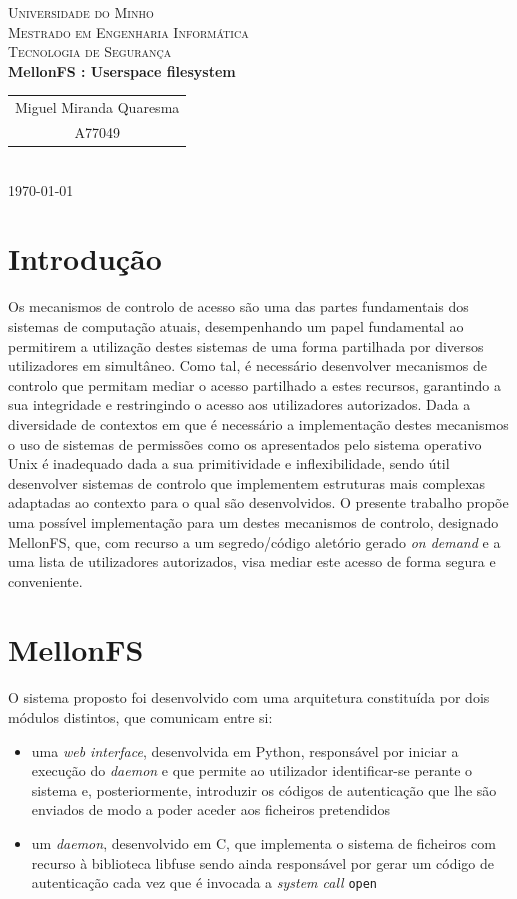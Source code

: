 \documentclass{article}
\begin{document}
{
\center
\textsc{\Large Universidade do Minho} \\ [0.5cm]
\textsc{\Large Mestrado em Engenharia Informática} \\ [0.5cm]
\textsc{\large Tecnologia de Segurança} \\ [0.5cm]

{\LARGE \bfseries MellonFS : Userspace filesystem } \\[0.5cm]

\begin{tabular}{c}
    Miguel Miranda Quaresma \\
    A77049  \\
\end{tabular} \\[0.5cm]

\today \\[1cm]
}

\section{Introdução}
Os mecanismos de controlo de acesso são uma das partes fundamentais dos sistemas de computação atuais, desempenhando um papel fundamental ao
permitirem a utilização destes sistemas de uma forma partilhada por diversos utilizadores em simultâneo. 
Como tal, é necessário desenvolver mecanismos de controlo que permitam mediar o acesso partilhado a estes recursos, garantindo a sua integridade 
e restringindo o acesso aos utilizadores autorizados. Dada a diversidade de contextos em que é necessário a implementação destes mecanismos o 
uso de sistemas de permissões como os apresentados pelo sistema operativo Unix é inadequado dada a sua primitividade e inflexibilidade, sendo 
útil desenvolver sistemas de controlo que implementem estruturas mais complexas adaptadas ao contexto para o qual são desenvolvidos. 
O presente trabalho propõe uma possível implementação para um destes mecanismos de controlo, designado MellonFS, que, com recurso a um 
segredo/código aletório gerado \textit{on demand} e a uma lista de utilizadores autorizados, visa mediar este acesso de forma segura e conveniente.

\section{MellonFS}
O sistema proposto foi desenvolvido com uma arquitetura constituída por dois módulos distintos, que comunicam entre si: 
\begin{itemize}
    \item uma \textit{web interface}, desenvolvida em Python, responsável por iniciar a execução do \textit{daemon} e que permite ao utilizador 
    identificar-se perante o sistema e, posteriormente, introduzir os códigos de autenticação que lhe são enviados de modo a poder aceder aos 
    ficheiros pretendidos
    \item um \textit{daemon}, desenvolvido em C, que implementa o sistema de ficheiros com recurso à biblioteca libfuse sendo ainda responsável 
    por gerar um código de autenticação cada vez que é invocada a \textit{system call} \texttt{open}
\end{itemize}
\end{document}
